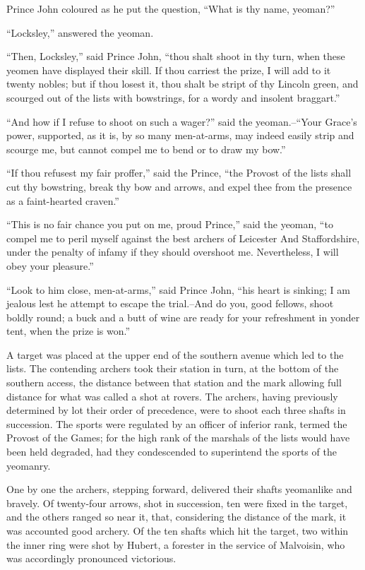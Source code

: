 Prince John coloured as he put the question, ``What is thy name,
yeoman?''

``Locksley,'' answered the yeoman.

``Then, Locksley,'' said Prince John, ``thou shalt shoot in thy turn,
when these yeomen have displayed their skill. If thou carriest the
prize, I will add to it twenty nobles; but if thou losest it, thou shalt
be stript of thy Lincoln green, and scourged out of the lists with
bowstrings, for a wordy and insolent braggart.''

``And how if I refuse to shoot on such a wager?'' said the
yeoman.--``Your Grace's power, supported, as it is, by so many
men-at-arms, may indeed easily strip and scourge me, but cannot compel
me to bend or to draw my bow.''

``If thou refusest my fair proffer,'' said the Prince, ``the Provost of
the lists shall cut thy bowstring, break thy bow and arrows, and expel
thee from the presence as a faint-hearted craven.''

``This is no fair chance you put on me, proud Prince,'' said the yeoman,
``to compel me to peril myself against the best archers of Leicester And
Staffordshire, under the penalty of infamy if they should overshoot me.
Nevertheless, I will obey your pleasure.''

``Look to him close, men-at-arms,'' said Prince John, ``his heart is
sinking; I am jealous lest he attempt to escape the trial.--And do you,
good fellows, shoot boldly round; a buck and a butt of wine are ready
for your refreshment in yonder tent, when the prize is won.''

A target was placed at the upper end of the southern avenue which led to
the lists. The contending archers took their station in turn, at the
bottom of the southern access, the distance between that station and the
mark allowing full distance for what was called a shot at rovers. The
archers, having previously determined by lot their order of precedence,
were to shoot each three shafts in succession. The sports were regulated
by an officer of inferior rank, termed the Provost of the Games; for the
high rank of the marshals of the lists would have been held degraded,
had they condescended to superintend the sports of the yeomanry.

One by one the archers, stepping forward, delivered their shafts
yeomanlike and bravely. Of twenty-four arrows, shot in succession, ten
were fixed in the target, and the others ranged so near it, that,
considering the distance of the mark, it was accounted good archery. Of
the ten shafts which hit the target, two within the inner ring were shot
by Hubert, a forester in the service of Malvoisin, who was accordingly
pronounced victorious.

